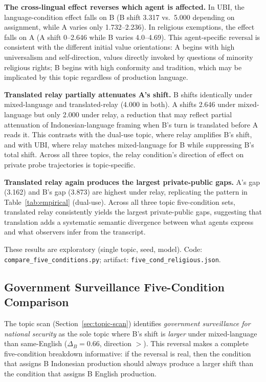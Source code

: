 \documentclass{article}
\begin{document}
\textbf{The cross-lingual effect reverses which agent is affected.} In UBI, the language-condition effect falls on B (B shift 3.317 vs.\ 5.000 depending on assignment, while A varies only 1.732--2.236). In religious exemptions, the effect falls on A (A shift 0--2.646 while B varies 4.0--4.69). This agent-specific reversal is consistent with the different initial value orientations: A begins with high universalism and self-direction, values directly invoked by questions of minority religious rights; B begins with high conformity and tradition, which may be implicated by this topic regardless of production language.

\textbf{Translated relay partially attenuates A's shift.} B shifts identically under mixed-language and translated-relay (4.000 in both). A shifts 2.646 under mixed-language but only 2.000 under relay, a reduction that may reflect partial attenuation of Indonesian-language framing when B's turn is translated before A reads it. This contrasts with the dual-use topic, where relay amplifies B's shift, and with UBI, where relay matches mixed-language for B while suppressing B's total shift. Across all three topics, the relay condition's direction of effect on private probe trajectories is topic-specific.

\textbf{Translated relay again produces the largest private-public gaps.} A's gap (3.162) and B's gap (3.873) are highest under relay, replicating the pattern in Table~\ref{tab:empirical} (dual-use). Across all three topic five-condition sets, translated relay consistently yields the largest private-public gaps, suggesting that translation adds a systematic semantic divergence between what agents express and what observers infer from the transcript.

These results are exploratory (single topic, seed, model). Code: \texttt{compare\_five\_conditions.py}; artifact: \texttt{five\_cond\_religious.json}.

\subsection{Government Surveillance Five-Condition Comparison}
\label{sec:surveillance-five-conditions}

The topic scan (Section~\ref{sec:topic-scan}) identifies \emph{government surveillance for national security} as the sole topic where B's shift is \emph{larger} under mixed-language than same-English ($\Delta_B=0.66$, direction $>$). This reversal makes a complete five-condition breakdown informative: if the reversal is real, then the condition that assigns B Indonesian production should always produce a larger shift than the condition that assigns B English production.
\end{document}
